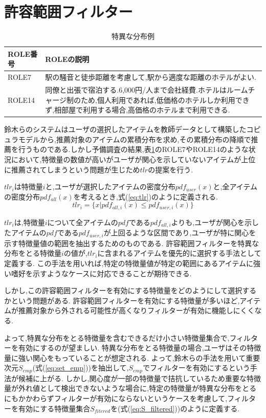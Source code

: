 \section{許容範囲フィルター}
\label{sbsc:tlr}
\begin{table}[H]
  \begin{center} {
    \caption{特異な分布例} \label{tbl:abnormal_role}
    \begin{tabular}{lp{25em}} 
\hline
ROLE番号 & ROLEの説明\\ \hline
ROLE7 & 駅の騒音と徒歩距離を考慮して,駅から適度な距離のホテルがよい.\\
ROLE14 & 同僚と出張で宿泊する.6,000円/人まで会社経費.ホテルはルームチャージ制のため,個人利用であれば,低価格のホテルしか利用できず,相部屋で利用する場合,高価格のホテルまで利用できる.\\
\hline
    \end{tabular}
  }
  \end{center} %
\end{table}
鈴木らのシステム\cite{Suzuki}はユーザの選択したアイテムを教師データとして構築したコピュラモデルから,推薦対象のアイテムの累積分布を求め,その累積分布の降順で推薦を行うものである.しかし予備調査の結果,表\ref{tbl:abnormal_role}のROLE7やROLE14のような状況において,特徴量の数値が高いがユーザが関心を示していないアイテムが上位に推薦されてしまうという問題が生じため$tlr$の提案を行う.\par
$tlr_i$は特徴量$i$と,ユーザが選択したアイテムの密度分布$pdf_{user}(x)$と,全アイテムの密度分布$pdf_{all}(x)$を考えるとき,式(\ref{eq:tlr})のように定義される.
\begin{equation}
\label{eq:tlr}
tlr_{i}=\{x | pdf_{all,i}(x) \leq pdf_{user,i}(x)\}
\end{equation}
\par
$tlr_i$は,特徴量$i$について全アイテムの$pdf$である$pdf_{all,i}$よりも,ユーザが関心を示したアイテムの$pdf$である$pdf_{user,i}$が上回るような区間であり,ユーザが特に関心を示す特徴量値の範囲を抽出するためのものである.
許容範囲フィルターを特異な分布をとる特徴量$i$の値が,$tlr_{i}$に含まれるアイテムを優先的に選択する手法として定義する.
この手法を用いれば,特定の特徴量値が特定の範囲にあるアイテムに強い嗜好を示すようなケースに対応できることが期待できる.\par
しかし,この許容範囲フィルターを有効にする特徴量をどのようにして選択するかという問題がある.
許容範囲フィルターを有効にする特徴量が多いほど,アイテムが推薦対象から外される可能性が高くなりフィルターが有効に機能しにくくなる.\par
よって,特異な分布をとる特徴量を含むできるだけ小さい特徴量集合で,フィルターを有効にするのが望ましい.
特異な分布をとる特徴量の場合,ユーザはその特徴量に強い関心をもっていることが想定される.
よって,鈴木らの手法を用いて重要次元$S_{emp}$(式(\ref{eq:set_emp}))を抽出して,$S_{emp}$でフィルターを有効にするという手法が候補に上がる.
しかし,関心度が一部の特徴量で拮抗しているため重要な特徴量が外れ値として検出できないような場合に,特定の特徴量が特異な分布をとるにもかかわらずフィルターが有効にならないというケースを考慮して,フィルターを有効にする特徴量集合$S_{fitered}$を(式(\ref{eq:S_filtered}))のように定義する.

